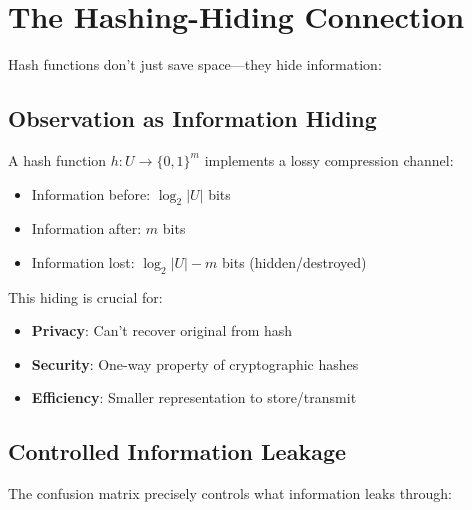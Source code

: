 \section{The Hashing-Hiding Connection}

Hash functions don't just save space—they hide information:

\subsection{Observation as Information Hiding}

\begin{theorem}
A hash function $h: U \to \{0,1\}^m$ implements a lossy compression channel:
\begin{itemize}
\item Information before: $\log_2 |U|$ bits
\item Information after: $m$ bits
\item Information lost: $\log_2 |U| - m$ bits (hidden/destroyed)
\end{itemize}
\end{theorem}

This hiding is crucial for:
\begin{itemize}
\item \textbf{Privacy}: Can't recover original from hash
\item \textbf{Security}: One-way property of cryptographic hashes
\item \textbf{Efficiency}: Smaller representation to store/transmit
\end{itemize}

\subsection{Controlled Information Leakage}

The confusion matrix precisely controls what information leaks through:

